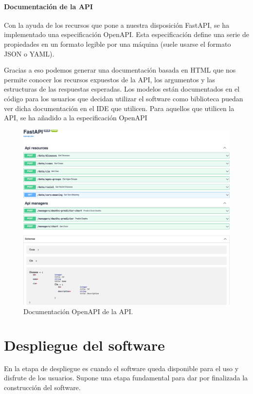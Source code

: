 \subsubsection{Documentación de la API}
Con la ayuda de los recursos que pone a nuestra disposición FastAPI, se ha implementado una especificación OpenAPI. Esta especificación define una serie de propiedades en un formato legible por una máquina (suele usarse el formato JSON o YAML).

Gracias a eso podemos generar una documentación basada en HTML que nos permite conocer los recursos expuestos de la API, los argumentos y las estructuras de las respuestas esperadas. Los modelos están documentados en el código para los usuarios que decidan utilizar el software como biblioteca puedan ver dicha documentación en el IDE que utilicen. Para aquellos que utilicen la API, se ha añadido a la especificación OpenAPI

\begin{figure}[h]
	\centering	
	\includegraphics[width=\textwidth]{doc/logos/imgs/openapi.png}
	\caption{ Documentación OpenAPI de la API. }
    \label{fig:worst_f_value}
\end{figure}



\chapter{Despliegue del software}
En la etapa de despliegue es cuando el software queda disponible para el uso y disfrute de los usuarios. Supone una etapa fundamental para dar por finalizada la construcción del software. 

